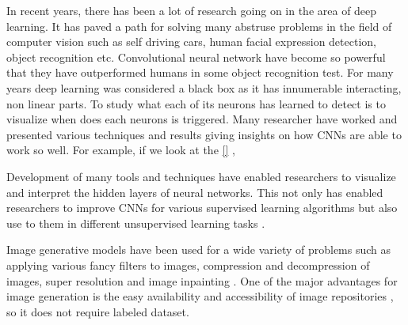 
\doublespacing
{}
   
In recent years, there has been a lot of research going on in the area of deep learning. It has paved a path for solving many abstruse problems in the field of computer vision such as self driving cars, human facial expression detection\cite{1612.02903}, object recognition etc. Convolutional neural network have become so powerful that they have outperformed humans in some object recognition \cite{CNN-Better,krizhevsky2012imagenet,szegedy2015going,he2016deep,simonyan2014very} test. For many years deep learning was considered a black box as it has innumerable interacting, non linear parts. To study what each of its neurons has learned to detect is to visualize when does each neurons is triggered.  
Many researcher have worked and presented various techniques and results giving insights on how CNNs are able to work so well. For example, if we look at the \cref{} ,

Development of many tools and techniques have enabled researchers to visualize and interpret the hidden layers of neural networks. This not only has enabled researchers to improve CNNs for various supervised learning algorithms but also use to them in different unsupervised learning tasks \cite{1506.06579}. 

\par

Image generative models have been used for a wide variety of problems such as applying various fancy filters to images, compression and decompression of images, super resolution \cite{1609.04802} and image inpainting \cite{1607.07539}.
 One of the major advantages for image generation is the easy availability and accessibility  of image repositories \cite{celeba} , so it does not require labeled dataset.


